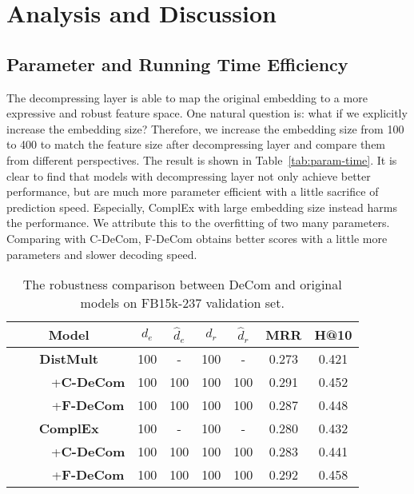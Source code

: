 \documentclass[letterpaper]{article} \usepackage{aaai20}  \usepackage{times}  \usepackage{helvet} \usepackage{courier}  \usepackage{booktabs}
\begin{document}
\section{Analysis and Discussion}

\subsection{Parameter and Running Time Efficiency}
The decompressing layer is able to map the original embedding to a more expressive and robust feature space. One natural question is: what if we explicitly increase the embedding size? Therefore, we increase the embedding size from 100 to 400 to match the feature size after decompressing layer and compare them from different perspectives. The result is shown in Table~\ref{tab:param-time}. It is clear to find that models with decompressing layer not only achieve better performance, but are much more parameter efficient with a little sacrifice of  prediction speed. Especially, ComplEx with large embedding size instead harms the performance. We attribute this to the overfitting of two many parameters. Comparing with C-DeCom, F-DeCom obtains better scores with a little more parameters and slower decoding speed.












\begin{table}[!ht]
    \centering
    \begin{tabular}{|c|cccc|cc|}
    \toprule
        Model & $d_e$ & $\hat{d}_e$ & $d_r$ & $\hat{d}_r$ & MRR & H@10 \\
    \midrule
        \textbf{DistMult} & 100 & - & 100 & - & 0.273 & 0.421\\
        ~~~~~~+\textbf{C-DeCom} & 100 & 100 & 100 & 100 & 0.291 & 0.452\\
        ~~~~~~+\textbf{F-DeCom} & 100 & 100 & 100 & 100 & 0.287 & 0.448\\
    \midrule
        \textbf{ComplEx} & 100 & - & 100 & - & 0.280 & 0.432\\
        ~~~~~~+\textbf{C-DeCom} & 100 & 100 & 100 & 100& 0.283 & 0.441\\
        ~~~~~~+\textbf{F-DeCom} & 100 & 100 & 100 & 100& 0.292 & 0.458\\
    \bottomrule
    \end{tabular}
    \caption{The robustness comparison between DeCom and original models on FB15k-237 validation set. }
    \label{tab:decom_expressive}
\end{table}
\end{document}
